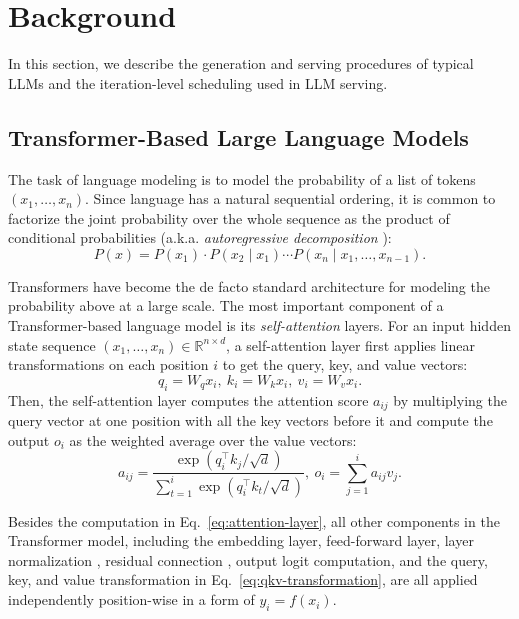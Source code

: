 \documentclass[sigplan,10pt]{acmart}
\begin{document}


\section{Background}

In this section, we describe the generation and serving procedures of typical LLMs and the iteration-level scheduling used in LLM serving.

\subsection{Transformer-Based Large Language Models}
The task of language modeling is to model the probability of a list of tokens $(x_1, \ldots, x_n).$ Since language has a natural sequential ordering, it is common to factorize the joint probability over the whole sequence as the product of conditional probabilities (a.k.a. \emph{autoregressive decomposition} \cite{bengio2000neural}):
\begin{equation}
P(x) = P(x_1) \cdot P(x_2\mid x_1) \cdots P(x_n \mid x_1, \ldots, x_{n-1}). \label{eq:autoregressive-decomposition}   
\end{equation}

Transformers \cite{vaswani2017attention} have become the de facto standard architecture for modeling the probability above at a large scale. The most important component of a Transformer-based language model is its \emph{self-attention} layers. For an input hidden state sequence $(x_1, \ldots, x_n) \in \mathbb{R}^{n\times d}$, a self-attention layer first applies linear transformations on each position $i$ to get the query, key, and value vectors:
\begin{equation}
q_i = W_q x_i, \  k_i = W_k x_i, \  v_i = W_v x_i. \label{eq:qkv-transformation}
\end{equation}
Then, the self-attention layer computes the attention score $a_{ij}$ by multiplying the query vector at one position with all the key vectors before it and compute the output $o_i$ as the weighted average over the value vectors:
\begin{equation}
a_{ij} = \frac{\exp(q_i^\top k_j / \sqrt{d})}{\sum_{t=1}^{i}\exp(q_i^\top k_t / \sqrt{d})}, \ o_i = \sum_{j=1}^{i} a_{ij} v_j. \label{eq:attention-layer}
\end{equation}

Besides the computation in Eq.~\ref{eq:attention-layer}, all other components in the Transformer model, including the embedding layer, feed-forward layer, layer normalization \cite{ba2016layer}, residual connection \cite{he2016deep}, output logit computation, and the query, key, and value transformation in Eq.~\ref{eq:qkv-transformation}, are all applied independently position-wise in a form of
$y_i = f(x_i).$
\end{document}
